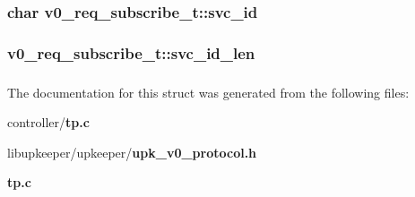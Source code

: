 \subsubsection[{svc\_\-id}]{\setlength{\rightskip}{0pt plus 5cm}char {\bf v0\_\-req\_\-subscribe\_\-t::svc\_\-id}}\label{structv0__req__subscribe__t_ac1e4789b9164fd628998b44058d03c29}
\subsubsection[{svc\_\-id\_\-len}]{ {\bf v0\_\-req\_\-subscribe\_\-t::svc\_\-id\_\-len}}\label{structv0__req__subscribe__t_a4a6ae50067d820e8a1e8b5fb5dcb0f2d}
\subsubsection[{UPK\_\-V0\_\-REQ\_\-SUBSCR\_\-T\_\-FIELDS}]{}\label{structv0__req__subscribe__t_ad19517b75cadef378c7fddf795ddcaca}


The documentation for this struct was generated from the following files:\begin{DoxyCompactItemize}
\item 
controller/{\bf tp.c}\item 
libupkeeper/upkeeper/{\bf upk\_\-v0\_\-protocol.h}\item 
{\bf tp.c}\end{DoxyCompactItemize}
